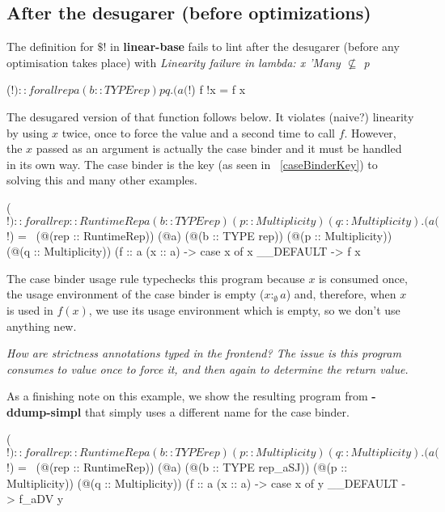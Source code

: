 \documentclass[a4paper, draft]{article}
\begin{document}
\subsection{After the desugarer (before optimizations)}

The definition for $\$!$ in \textbf{linear-base}\cite{} fails to lint after the
desugarer (before any optimisation takes place) with \emph{Linearity failure in
lambda: x 'Many $\not\subseteq$ p}
\begin{code}
($!) :: forall {rep} a (b :: TYPE rep) p q. (a %
($!) f !x = f x
\end{code}

The desugared version of that function follows below. It violates (naive?)
linearity by using $x$ twice, once to force the value and a second time to call
$f$. However, the $x$ passed as an argument is actually the case binder and it
must be handled in its own way. The case binder is the key (as seen in ~\ref{caseBinderKey}) to solving this
and many other examples.
\begin{code}
($!)
  :: forall {rep :: RuntimeRep} a (b :: TYPE rep) (p :: Multiplicity)
            (q :: Multiplicity).
     (a %
($!)
  = \ (@(rep :: RuntimeRep))
      (@a)
      (@(b :: TYPE rep))
      (@(p :: Multiplicity))
      (@(q :: Multiplicity))
      (f :: a %
      (x :: a) ->
      case x of x { __DEFAULT -> f x }
\end{code}

%
The case binder usage rule typechecks this program because $x$ is consumed once,
the usage environment of the case binder is empty ($x :_\emptyset a$) and,
therefore, when $x$ is used in $f(x)$, we use its usage environment which is
empty, so we don't use anything new.

\emph{How are strictness annotations typed in the frontend? The issue is this program
consumes to value once to force it, and then again to determine the return
value.}


As a finishing note on this example, we show the resulting program from
\textbf{-ddump-simpl} that simply uses a different name for the case binder.
\begin{code}
($!)
  :: forall {rep :: RuntimeRep} a (b :: TYPE rep)
            (p :: Multiplicity) (q :: Multiplicity).
     (a %
($!)
  = \ (@(rep :: RuntimeRep))
      (@a)
      (@(b :: TYPE rep_aSJ))
      (@(p :: Multiplicity))
      (@(q :: Multiplicity))
      (f :: a %
      (x :: a) ->
      case x of y { __DEFAULT -> f_aDV y }
\end{code}
\end{document}

